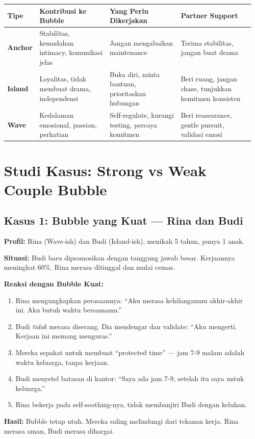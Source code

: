 \begin{center}
\renewcommand{\arraystretch}{1.6}
\begin{tabular}{|>{\raggedright}p{2.5cm}|>{\raggedright}p{4cm}|>{\raggedright}p{4cm}|>{\raggedright\arraybackslash}p{4cm}|}
\hline
\rowcolor{primary!20}
\textbf{Tipe} & \textbf{Kontribusi ke Bubble} & \textbf{Yang Perlu Dikerjakan} & \textbf{Partner Support} \\
\hline
\textbf{Anchor} & Stabilitas, kemudahan intimacy, komunikasi jelas & Jangan mengabaikan maintenance & Terima stabilitas, jangan buat drama \\
\hline
\textbf{Island} & Loyalitas, tidak membuat drama, independensi & Buka diri, minta bantuan, prioritaskan hubungan & Beri ruang, jangan chase, tunjukkan komitmen konsisten \\
\hline
\textbf{Wave} & Kedalaman emosional, passion, perhatian & Self-regulate, kurangi testing, percaya komitmen & Beri reassurance, gentle pursuit, validasi emosi \\
\hline
\end{tabular}
\end{center}

\section{Studi Kasus: Strong vs Weak Couple Bubble}

\subsection{Kasus 1: Bubble yang Kuat --- Rina dan Budi}

\begin{insightbox}
\textbf{Profil:} Rina (Wave-ish) dan Budi (Island-ish), menikah 5 tahun, punya 1 anak.

\textbf{Situasi:} Budi baru dipromosikan dengan tanggung jawab besar. Kerjaannya meningkat 60\%. Rina merasa ditinggal dan mulai cemas.

\textbf{Reaksi dengan Bubble Kuat:}
\begin{enumerate}
    \item Rina mengungkapkan perasaannya: ``Aku merasa kehilanganmu akhir-akhir ini. Aku butuh waktu bersamamu.''
    \item Budi \textit{tidak} merasa diserang. Dia mendengar dan validate: ``Aku mengerti. Kerjaan ini memang menguras.''
    \item Mereka sepakat untuk membuat ``protected time'' --- jam 7-9 malam adalah waktu keluarga, tanpa kerjaan.
    \item Budi menyetel batasan di kantor: ``Saya ada jam 7-9, setelah itu saya untuk keluarga.''
    \item Rina bekerja pada self-soothing-nya, tidak membanjiri Budi dengan keluhan.
\end{enumerate}

\textbf{Hasil:} Bubble tetap utuh. Mereka saling melindungi dari tekanan kerja. Rina merasa aman, Budi merasa dihargai.
\end{insightbox}

